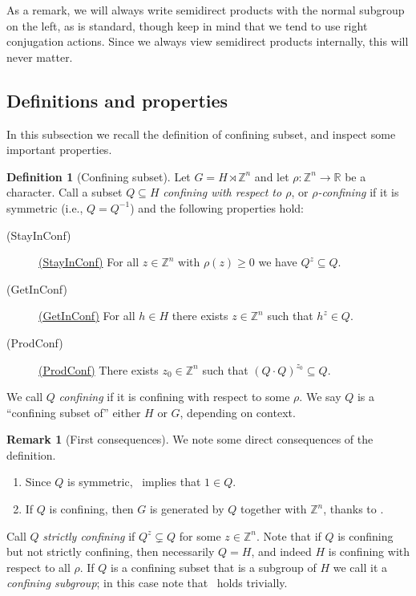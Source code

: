 \documentclass[reqno,12pt]{amsart}\setcounter{tocdepth}{1}
\newcommand{\listlabel}[1]{%
  \item[\quad(#1)]\hypertarget{#1}{}\global\expandafter\def\csname #1\endcsname{\hyperlink{#1}{(#1)}}}
\theoremstyle{definition}
\newtheorem{definition}[theorem]{Definition}
\newtheorem{remark}[theorem]{Remark}
\newcommand{\Z}{\mathbb{Z}}
\newcommand{\R}{\mathbb{R}}
\numberwithin{equation}{section}
\begin{document}
As a remark, we will always write semidirect products with the normal subgroup on the left, as is standard, though keep in mind that we tend to use right conjugation actions. Since we always view semidirect products internally, this will never matter.


\subsection{Definitions and properties}\label{ssec:confining_defs}

In this subsection we recall the definition of confining subset, and inspect some important properties.

\begin{definition}[Confining subset]\label{def:confining}
Let $G=H\rtimes \Z^n$ and let $\rho\colon \Z^n \to\R$ be a character. Call a subset $Q\subseteq H$ \emph{confining with respect to $\rho$}, or \emph{$\rho$-confining} if it is symmetric (i.e., $Q = Q^{-1}$) and the following properties hold:
\begin{description}
    \listlabel{StayInConf} For all $z\in\Z^n$ with $\rho(z)\ge 0$ we have $Q^z\subseteq Q$.
    \listlabel{GetInConf} For all $h\in H$ there exists $z\in \Z^n$ such that $h^z\in Q$.
    \listlabel{ProdConf} There exists $z_0\in \Z^n$ such that $(Q\cdot Q)^{z_0}\subseteq Q$.
\end{description}
We call $Q$ \emph{confining} if it is confining with respect to some $\rho$. We say $Q$ is a ``confining subset of'' either $H$ or $G$, depending on context.
\end{definition}

\begin{remark}[First consequences]
\label{rem:conf:consequences}
We note some direct consequences of the definition.
\begin{enumerate}
\item Since $Q$ is symmetric, \ProdConf\ implies that $1\in Q$.
\item If $Q$ is confining, then $G$ is generated by $Q$ together with $\Z^n$, thanks to \GetInConf.
\end{enumerate}
\end{remark}

Call $Q$ \emph{strictly confining} if $Q^z\subsetneq Q$ for some $z\in\Z^n$. Note that if $Q$ is confining but not strictly confining, then necessarily $Q=H$, and indeed $H$ is confining with respect to all $\rho$. If $Q$ is a confining subset that is a subgroup of $H$ we call it a \emph{confining subgroup}; in this case note that \ProdConf\ holds trivially.
\end{document}

